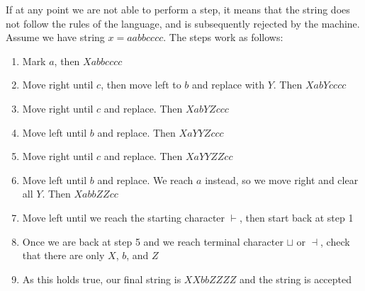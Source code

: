 \documentclass[letterpaper]{article}
\theoremstyle{plain}
\theoremstyle{definition}
\theoremstyle{remark}
\begin{document}
If at any point we are not able to perform a step, it means that the string does not follow the rules of the language, and is subsequently rejected by the machine. Assume we have string $x=aabbcccc$. The steps work as follows:
\begin{enumerate}
    \item Mark $a$, then $Xabbcccc$
    \item Move right until $c$, then move left to $b$ and replace with $Y$. Then $XabYcccc$
    \item Move right until $c$ and replace. Then $XabYZccc$
    \item Move left until $b$ and replace. Then $XaYYZccc$
    \item Move right until $c$ and replace. Then $XaYYZZcc$
    \item Move left until $b$ and replace. We reach $a$ instead, so we move right and clear all $Y$. Then $XabbZZcc$
    \item Move left until we reach the starting character $\vdash$, then start back at step 1
    \item Once we are back at step 5 and we reach terminal character $\sqcup$ or $\dashv$, check that there are only $X$, $b$, and $Z$ 
    \item As this holds true, our final string is $XXbbZZZZ$ and the string is accepted
\end{enumerate}
\end{document}
